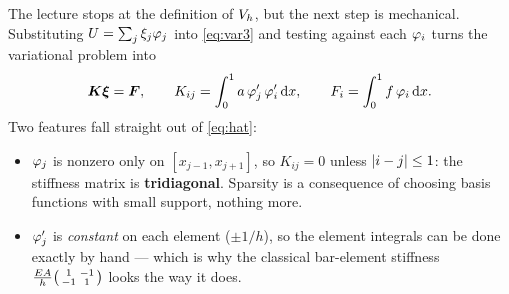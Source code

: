 \begin{intuition}
The lecture stops at the definition of $V_{h}$, but the next step is mechanical.
Substituting $U=\sum_{j}\xi_{j}\varphi_{j}$ into \eqref{eq:var3} and testing
against each $\varphi_{i}$ turns the variational problem into
\[
  \bm{K}\bm{\xi}=\bm{F},
  \qquad
  K_{ij} = \int_{0}^{1} a\,\varphi_{j}'\,\varphi_{i}'\,\mathrm{d} x,
  \qquad
  F_{i} = \int_{0}^{1} f\,\varphi_{i}\,\mathrm{d} x .
\]
Two features fall straight out of \eqref{eq:hat}:
\begin{itemize}[leftmargin=1.4em,itemsep=2pt]
  \item $\varphi_{j}$ is nonzero only on $[x_{j-1},x_{j+1}]$, so
        $K_{ij}=0$ unless $\lvert i-j\rvert\le1$: the stiffness matrix is
        \textbf{tridiagonal}. Sparsity is a consequence of choosing basis
        functions with small support, nothing more.
  \item $\varphi_{j}'$ is \emph{constant} on each element ($\pm1/h$), so the
        element integrals can be done exactly by hand --- which is why the
        classical bar-element stiffness $\frac{EA}{h}\begin{psmallmatrix}1&-1\\-1&1\end{psmallmatrix}$
        looks the way it does.
\end{itemize}
\end{intuition}
